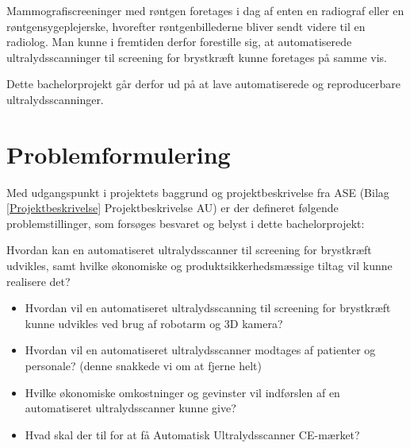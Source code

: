 Mammografiscreeninger med røntgen foretages i dag af enten en radiograf eller en røntgensygeplejerske, hvorefter røntgenbillederne bliver sendt videre til en radiolog. Man kunne i fremtiden derfor forestille sig, at automatiserede ultralydsscanninger til screening for brystkræft kunne foretages på samme vis.

Dette bachelorprojekt går derfor ud på at lave automatiserede og reproducerbare ultralydsscanninger.

\section{Problemformulering}
Med udgangspunkt i projektets baggrund og projektbeskrivelse fra ASE (Bilag \ref{Projektbeskrivelse} Projektbeskrivelse AU) er der defineret følgende problemstillinger, som forsøges besvaret og belyst i dette bachelorprojekt:

Hvordan kan en automatiseret ultralydsscanner til screening for brystkræft udvikles, samt hvilke økonomiske og produktsikkerhedsmæssige tiltag vil kunne realisere det?

\let\labelitemi\labelitemii
\begin{itemize}
\item Hvordan vil en automatiseret ultralydsscanning til screening for brystkræft kunne udvikles ved brug af robotarm og 3D kamera?
\item Hvordan vil en automatiseret ultralydsscanner modtages af patienter og personale? (denne snakkede vi om at fjerne helt) 
\item Hvilke økonomiske omkostninger og gevinster vil indførslen af en automatiseret ultralydsscanner kunne give? 
\item Hvad skal der til for at få Automatisk Ultralydsscanner CE-mærket? 
\end{itemize}
